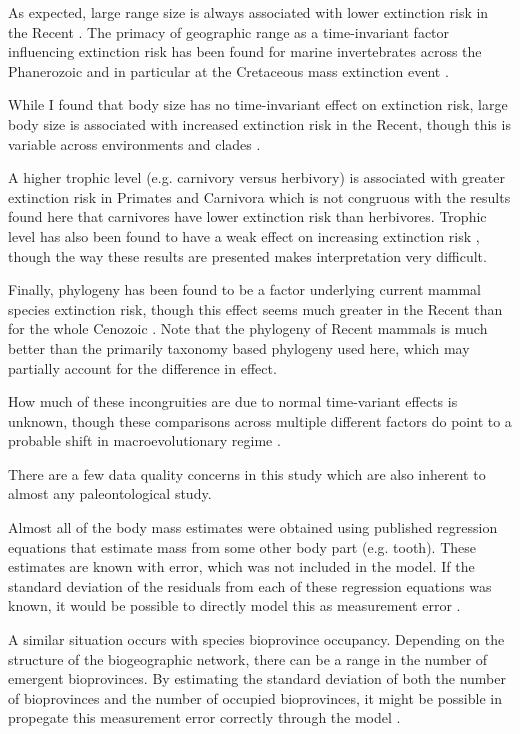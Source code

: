 \documentclass[12pt,letterpaper]{article}
\begin{document}
As expected, large range size is always associated with lower extinction risk in the Recent \citep{Fritz2009,Fritz2010b,Liow2009,Purvis2000a}. The primacy of geographic range as a time-invariant factor influencing extinction risk has been found for marine invertebrates across the Phanerozoic and in particular at the Cretaceous mass extinction event \citep{Jablonski1986,Payne2007}.

While I found that body size has no time-invariant effect on extinction risk, large body size is associated with increased extinction risk in the Recent, though this is variable across environments and clades \citep{Liow2009,Fritz2009,Purvis2000a}. 

A higher trophic level (e.g. carnivory versus herbivory) is associated with greater extinction risk in Primates and Carnivora \citep{Purvis2000a} which is not congruous with the results found here that carnivores have lower extinction risk than herbivores. Trophic level has also been found to have a weak effect on increasing extinction risk \citep{Liow2009}, though the way these results are presented makes interpretation very difficult.

Finally, phylogeny has been found to be a factor underlying current mammal species extinction risk, though this effect seems much greater in the Recent than for the whole Cenozoic \citep{Fritz2010b}. Note that the phylogeny of Recent mammals is much better than the primarily taxonomy based phylogeny used here, which may partially account for the difference in effect.

How much of these incongruities are due to normal time-variant effects is unknown, though these comparisons across multiple different factors do point to a probable shift in macroevolutionary regime \citep{Jablonski1986}.

There are a few data quality concerns in this study which are also inherent to almost any paleontological study.

Almost all of the body mass estimates were obtained using published regression equations that estimate mass from some other body part (e.g. tooth). These estimates are known with error, which was not included in the model. If the standard deviation of the residuals from each of these regression equations was known, it would be possible to directly model this as measurement error \citep{Gelman2013d}. 

A similar situation occurs with species bioprovince occupancy. Depending on the structure of the biogeographic network, there can be a range in the number of emergent bioprovinces. By estimating the standard deviation of both the number of bioprovinces and the number of occupied bioprovinces, it might be possible in propegate this measurement error correctly through the model \citep{Gelman2013d}. 
\end{document}
